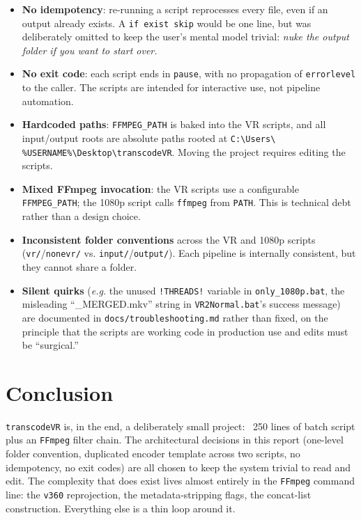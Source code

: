 \documentclass[11pt,a4paper]{article}
\begin{document}
\begin{itemize}[leftmargin=1.5em, itemsep=0.4em]
  \item \textbf{No idempotency}: re-running a script reprocesses every
        file, even if an output already exists. A \texttt{if exist
        skip} would be one line, but was deliberately omitted to keep
        the user's mental model trivial: \emph{nuke the output folder
        if you want to start over.}
  \item \textbf{No exit code}: each script ends in \texttt{pause}, with
        no propagation of \texttt{errorlevel} to the caller. The scripts
        are intended for interactive use, not pipeline automation.
  \item \textbf{Hardcoded paths}: \texttt{FFMPEG\_PATH} is baked into
        the VR scripts, and all input/output roots are absolute paths
        rooted at \texttt{C:\textbackslash Users\textbackslash
        \%USERNAME\%\textbackslash Desktop\textbackslash transcodeVR}.
        Moving the project requires editing the scripts.
  \item \textbf{Mixed FFmpeg invocation}: the VR scripts use a
        configurable \texttt{FFMPEG\_PATH}; the 1080p script calls
        \texttt{ffmpeg} from \texttt{PATH}. This is technical debt
        rather than a design choice.
  \item \textbf{Inconsistent folder conventions} across the VR and
        1080p scripts (\texttt{vr/}/\texttt{nonevr/} vs.
        \texttt{input/}/\texttt{output/}). Each pipeline is internally
        consistent, but they cannot share a folder.
  \item \textbf{Silent quirks} (\textit{e.g.} the unused
        \texttt{!THREADS!} variable in \texttt{only\_1080p.bat},
        the misleading ``\_MERGED.mkv'' string in
        \texttt{VR2Normal.bat}'s success message) are documented in
        \texttt{docs/troubleshooting.md} rather than fixed, on the
        principle that the scripts are working code in production
        use and edits must be ``surgical.''
\end{itemize}

\section{Conclusion}

\noindent
\texttt{transcodeVR} is, in the end, a deliberately small project: ~250
lines of batch script plus an \texttt{FFmpeg} filter chain. The
architectural decisions in this report (one-level folder convention,
duplicated encoder template across two scripts, no idempotency, no
exit codes) are all chosen to keep the system trivial to read and edit.
The complexity that does exist lives almost entirely in the
\texttt{FFmpeg} command line: the \texttt{v360} reprojection, the
metadata-stripping flags, the concat-list construction. Everything
else is a thin loop around it.
\end{document}
